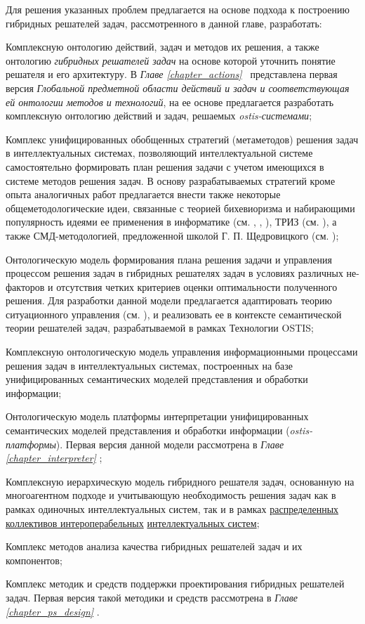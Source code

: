 Для решения указанных проблем предлагается на основе подхода к построению гибридных решателей задач, рассмотренного в данной главе, разработать:
\begin{textitemize}
	\item Комплексную онтологию действий, задач и методов их решения, а также онтологию \textit{гибридных решателей задач} на основе которой уточнить понятие решателя и его архитектуру. В \textit{Главе \ref{chapter_actions}~} представлена первая версия \textit{Глобальной предметной области действий и задач и соответствующая ей онтологии методов и технологий}, на ее основе предлагается разработать комплексную онтологию действий и задач, решаемых \textit{ostis-системами};
	\item Комплекс унифицированных обобщенных стратегий (метаметодов) решения задач в интеллектуальных системах, позволяющий интеллектуальной системе самостоятельно формировать план решения задачи с учетом имеющихся в системе методов решения задач. В основу разрабатываемых стратегий кроме опыта аналогичных работ предлагается внести также некоторые общеметодологические идеи, связанные с теорией бихевиоризма и набирающими популярность идеями ее применения в информатике (см. , , ), ТРИЗ (см. ), а также СМД-методологией, предложенной школой Г. П. Щедровицкого (см. );
	\item Онтологическую модель формирования плана решения задачи и управления процессом решения задач в гибридных решателях задач в условиях различных не-факторов и отсутствия четких критериев оценки оптимальности полученного решения. Для разработки данной модели предлагается адаптировать теорию ситуационного управления (см. ), и реализовать ее в контексте семантической теории решателей задач, разрабатываемой в рамках Технологии OSTIS;
	\item Комплексную онтологическую модель управления информационными процессами решения задач в интеллектуальных системах, построенных на базе унифицированных семантических моделей представления и обработки информации;
	\item Онтологическую модель платформы интерпретации унифицированных семантических моделей представления и обработки информации (\textit{ostis-платформы}). Первая версия данной модели рассмотрена в \textit{Главе \ref{chapter_interpreter} };
	\item Комплексную иерархическую модель гибридного решателя задач, основанную на многоагентном подходе и учитывающую необходимость решения задач как в рамках одиночных интеллектуальных систем, так и в рамках \underline{распределенных} \underline{коллективов интероперабельных} \underline{интеллектуальных систем};
	\item Комплекс методов анализа качества гибридных решателей задач и их компонентов;
	\item Комплекс методик и средств поддержки проектирования гибридных решателей задач. Первая версия такой методики и средств рассмотрена в \textit{Главе \ref{chapter_ps_design} }.
\end{textitemize}

